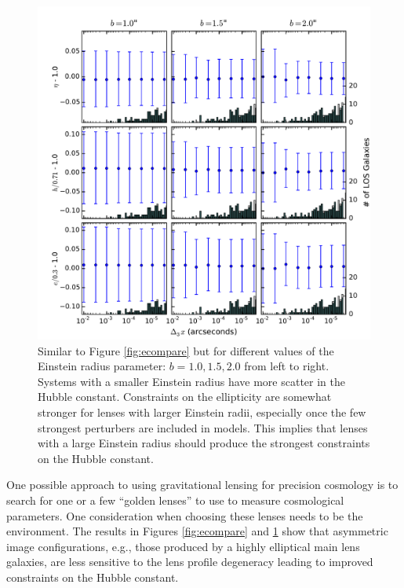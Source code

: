\documentclass{emulateapj}
\begin{document}
\begin{figure}
\begin{center}
\includegraphics[width=1\textwidth]{recompare.pdf}
\caption{\label{fig:recompare} Similar to Figure \ref{fig:ecompare} but for different values of the Einstein radius parameter: $b = 1.0,1.5,2.0$ from left to right. Systems with a smaller Einstein radius have more scatter in the Hubble constant. Constraints on the ellipticity are somewhat stronger for lenses with larger Einstein radii, especially once the few strongest perturbers are included in models. This implies that lenses with a large Einstein radius should produce the strongest constraints on the Hubble constant.%
}
\end{center}
\end{figure}

One possible approach to using gravitational lensing for precision cosmology is to search for one or a few ``golden lenses'' to use to measure cosmological parameters. One consideration when choosing these lenses needs to be the environment. The results in Figures \ref{fig:ecompare} and \ref{fig:recompare} show that asymmetric image configurations, e.g., those produced by a highly elliptical main lens galaxies, are less sensitive to the lens profile degeneracy leading to improved constraints on the Hubble constant.
\end{document}
